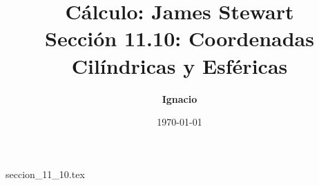 \documentclass[11pt,spanish,oneside]{report}
\title{\textbf{Cálculo: James Stewart} \\ \Large Sección 11.10: Coordenadas Cilíndricas y Esféricas}
\author{\textbf{Ignacio}}
\date{\today}
\begin{document}
\maketitle

{seccion_11_10.tex}
\end{document}

